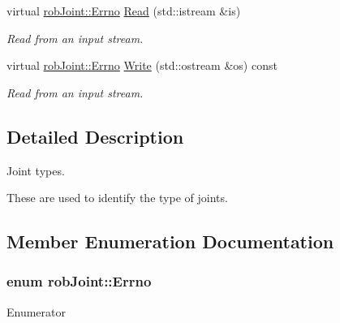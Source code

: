 \begin{DoxyCompactItemize}
virtual \hyperlink{classrob_joint_a6656cb0c2f8c9aadf0c446abd6bebed7}{rob\+Joint\+::\+Errno} \hyperlink{classrob_joint_a254cec6739e7d0c9233d46064870944a}{Read} (std\+::istream \&is)
\begin{DoxyCompactList}\small\item\em Read from an input stream. \end{DoxyCompactList}\item 
virtual \hyperlink{classrob_joint_a6656cb0c2f8c9aadf0c446abd6bebed7}{rob\+Joint\+::\+Errno} \hyperlink{classrob_joint_ab15a6e370553cf232a4d49ca40bca0b2}{Write} (std\+::ostream \&os) const 
\begin{DoxyCompactList}\small\item\em Read from an input stream. \end{DoxyCompactList}\end{DoxyCompactItemize}


\subsection{Detailed Description}
Joint types. 

These are used to identify the type of joints. 

\subsection{Member Enumeration Documentation}
\hypertarget{classrob_joint_a6656cb0c2f8c9aadf0c446abd6bebed7}{}
\subsubsection[{Errno}]{\setlength{\rightskip}{0pt plus 5cm}enum {\bf rob\+Joint\+::\+Errno}}\label{classrob_joint_a6656cb0c2f8c9aadf0c446abd6bebed7}
\begin{Desc}
\item[Enumerator]\par
\begin{description}
\item[{\em 
\hypertarget{classrob_joint_a6656cb0c2f8c9aadf0c446abd6bebed7a543dbf6fd076d13f978a7fd7429d9986}{}E\+S\+U\+C\+C\+E\+S\+S\label{classrob_joint_a6656cb0c2f8c9aadf0c446abd6bebed7a543dbf6fd076d13f978a7fd7429d9986}
}]\item[{\em 
\hypertarget{classrob_joint_a6656cb0c2f8c9aadf0c446abd6bebed7ae679e9dfdb01c1ca7309f37d7c790efa}{}E\+F\+A\+I\+L\+U\+R\+E\label{classrob_joint_a6656cb0c2f8c9aadf0c446abd6bebed7ae679e9dfdb01c1ca7309f37d7c790efa}
}]\end{description}
\end{Desc}
\hypertarget{classrob_joint_a7f77320bad87c259f71c18443f7bdd9c}{}
